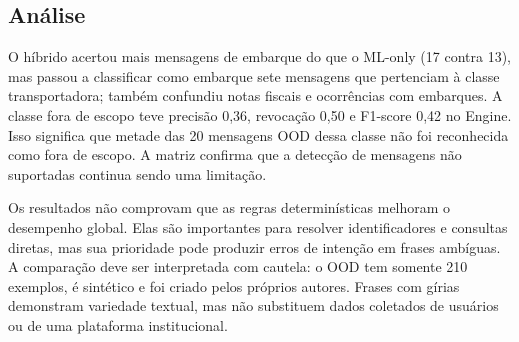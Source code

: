 \documentclass[conference]{IEEEtran}
\begin{document}
\begin{table}[t]
\centering
\caption{Matriz de confusão do Engine híbrido no OOD (210 mensagens)}
\label{tab:cm-hybrid}
\scriptsize
\setlength{\tabcolsep}{4pt}
\end{table}

\subsection{Análise}

O híbrido acertou mais mensagens de embarque do que o ML-only (17 contra 13), mas passou a classificar como embarque sete mensagens que pertenciam à classe transportadora; também confundiu notas fiscais e ocorrências com embarques. A classe fora de escopo teve precisão 0,36, revocação 0,50 e F1-score 0,42 no Engine. Isso significa que metade das 20 mensagens OOD dessa classe não foi reconhecida como fora de escopo. A matriz confirma que a detecção de mensagens não suportadas continua sendo uma limitação.

Os resultados não comprovam que as regras determinísticas melhoram o desempenho global. Elas são importantes para resolver identificadores e consultas diretas, mas sua prioridade pode produzir erros de intenção em frases ambíguas. A comparação deve ser interpretada com cautela: o OOD tem somente 210 exemplos, é sintético e foi criado pelos próprios autores. Frases com gírias demonstram variedade textual, mas não substituem dados coletados de usuários ou de uma plataforma institucional.
\end{document}
